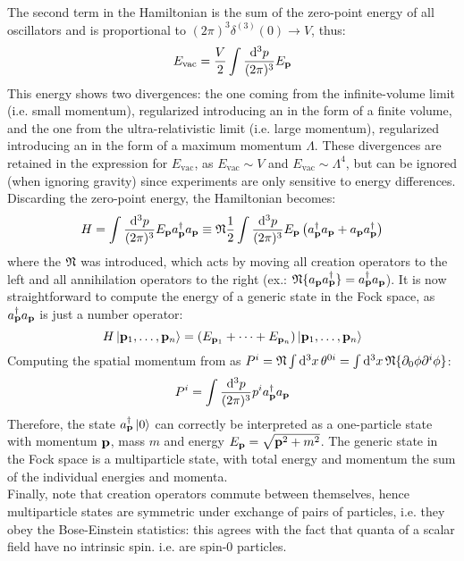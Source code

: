 The second term in the Hamiltonian  is the sum of the zero-point energy of all oscillators and is proportional to $ (2\pi)^3 \delta^{(3)}(0) \rightarrow V $, thus:
\begin{equation*}
  E_\text{vac} = \frac{V}{2} \int \frac{\mathrm{d}^3p}{(2\pi)^3} E_{\mathbf{p}}
\end{equation*}
This energy shows two divergences: the one coming from the infinite-volume limit (i.e. small momentum), regularized introducing an  in the form of a finite volume, and the one from the ultra-relativistic limit (i.e. large momentum), regularized introducing an  in the form of a maximum momentum $ \Lambda $. These divergences are retained in the expression for $ E_\text{vac} $, as $ E_\text{vac} \sim V $ and $ E_\text{vac} \sim \Lambda^4 $, but can be ignored (when ignoring gravity) since experiments are only sensitive to energy differences.\\
Discarding the zero-point energy, the Hamiltonian becomes:
\begin{equation}
  H = \int \frac{\mathrm{d}^3p}{(2\pi)^3} E_{\mathbf{p}} a_{\mathbf{p}}^\dagger a_{\mathbf{p}} \equiv \mathfrak{N} \frac{1}{2} \int \frac{\mathrm{d}^3p}{(2\pi)^3} E_{\mathbf{p}} \left( a_{\mathbf{p}}^\dagger a_{\mathbf{p}} + a_{\mathbf{p}} a_{\mathbf{p}}^\dagger \right)
\end{equation}
where the  $ \mathfrak{N} $ was introduced, which acts by moving all creation operators to the left and all annihilation operators to the right (ex.: $ \mathfrak{N}\{a_{\mathbf{p}} a_{\mathbf{p}}^\dagger\} = a_{\mathbf{p}}^\dagger a_{\mathbf{p}} $). It is now straightforward to compute the energy of a generic state in the Fock space, as $ a_{\mathbf{p}}^\dagger a_{\mathbf{p}} $ is just a number operator:
\begin{equation}
  H \ket{\mathbf{p}_1 , \dots , \mathbf{p}_n} = \left( E_{\mathbf{p}_1} + \dots + E_{\mathbf{p}_n} \right) \ket{\mathbf{p}_1 , \dots , \mathbf{p}_n}
\end{equation}
Computing the spatial momentum from  as $ P^i = \mathfrak{N} \int \mathrm{d}^3x\, \theta^{0i} = \int \mathrm{d}^3x\, \mathfrak{N}\{\partial_0 \phi \partial^i \phi\} $:
\begin{equation}
  P^i = \int \frac{\mathrm{d}^3p}{(2\pi)^3} p^i a_{\mathbf{p}}^\dagger a_{\mathbf{p}}
\end{equation}
Therefore, the state $ a_{\mathbf{p}}^\dagger \ket{0} $ can correctly be interpreted as a one-particle state with momentum $ \mathbf{p} $, mass $ m $ and energy $ E_{\mathbf{p}} = \sqrt{\mathbf{p}^2 + m^2} $. The generic state in the Fock space is a multiparticle state, with total energy and momentum the sum of the individual energies and momenta.\\
Finally, note that creation operators commute between themselves, hence multiparticle states are symmetric under exchange of pairs of particles, i.e. they obey the Bose-Einstein statistics: this agrees with the fact that quanta of a scalar field have no intrinsic spin. i.e. are spin-0 particles.

